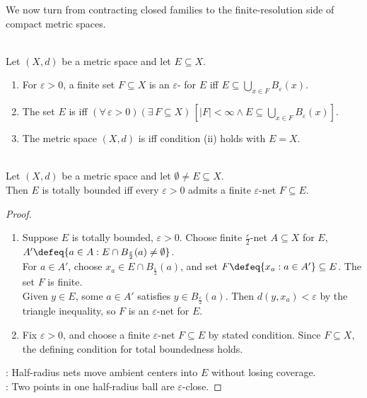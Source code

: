 We now turn from contracting closed families to the finite-resolution side of compact metric spaces.

\begin{definition} \label{def:totally-bounded-metric-space} \\
Let $(X,d)$ be a metric space and let $E\subseteq X$.
\begin{enumerate}[label=(\roman*)]
\setlength{\itemsep}{0pt}
\item For $\varepsilon>0$, a finite set $F\subseteq X$ is an $\varepsilon$- for $E$ iff $E\subseteq\bigcup\limits_{x\in F}B_\varepsilon(x)$.
\item The set $E$ is  iff $(\forall\,\varepsilon>0)(\exists\,F\subseteq X)\,[|F|<\infty\land E\subseteq\bigcup\limits_{x\in F}B_\varepsilon(x)]$.
\item The metric space $(X,d)$ is  iff condition (ii) holds with $E=X$.
\end{enumerate}
\end{definition}

\begin{proposition} \label{prop:totally-bounded-centers-in-set} \\
Let $(X,d)$ be a metric space and let $\emptyset\ne E\subseteq X$.\\
Then $E$ is totally bounded iff every $\varepsilon>0$ admits a finite $\varepsilon$-net $F\subseteq E$.
\begin{proof}
\begin{enumerate}[label=\roman*.]
\setlength{\itemsep}{0pt}
\item[$(\Rightarrow)$] Suppose $E$ is totally bounded, $\varepsilon>0$. Choose finite $\frac{\varepsilon}{2}$-net $A\subseteq X$ for $E$, $A'\defeq\{a\in A:E\cap B_{\frac{\varepsilon}{2}}(a)\ne\emptyset\}$.\\
For $a\in A'$, choose $x_a\in E\cap B_{\frac{\varepsilon}{2}}(a)$, and set $F\defeq\{x_a:a\in A'\}\subseteq E$. The set $F$ is finite.\\
Given $y\in E$, some $a\in A'$ satisfies $y\in B_{\frac{\varepsilon}{2}}(a)$. Then $d(y,x_a)<\varepsilon$ by the triangle inequality, so $F$ is an $\varepsilon$-net for $E$.
\item[$(\Leftarrow)$] Fix $\varepsilon>0$, and choose a finite $\varepsilon$-net $F\subseteq E$ by stated condition. Since $F\subseteq X$, the defining condition for total boundedness holds.
\end{enumerate}
: Half-radius nets move ambient centers into $E$ without losing coverage.\\
: Two points in one half-radius ball are $\varepsilon$-close.
\end{proof}
\end{proposition}

